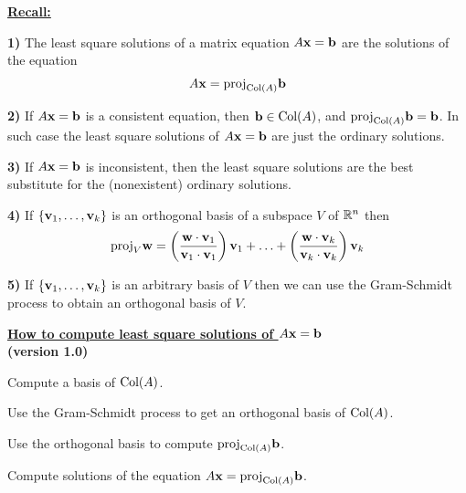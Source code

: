 {\newpage



\underline{\bf Recall:}

\vskip 5mm

{\bf 1)} The least square solutions of a matrix equation $A{\bf x} = {\bf b}$ are the solutions of the equation
$$A{\bf x} = \text{proj}_{\text{Col}(A)}{\bf b}$$

\vskip 15mm

{\bf 2)} If $A{\bf x} = {\bf b}$ is a consistent equation, then ${\bf b} \in \text{Col}(A)$, and $ \text{proj}_{\text{Col}(A)}{\bf b} = {\bf b}$. 
In such case the least square solutions of $A{\bf x} = {\bf b}$ are just the ordinary solutions. 

\vskip 15mm

{\bf 3)} If  $A{\bf x} = {\bf b}$ is inconsistent, then the least square solutions are the best substitute for the 
(nonexistent) ordinary solutions. 

\vskip 15mm

{\bf 4)} If $\{{\bf v}_{1}, \dots, {\bf v}_{k}\}$ is an orthogonal basis of a subspace $V$ of ${\mathbb R}^{n}$ then 
$$
\text{proj}_{V}{\bf w} = 
\left(\frac{{\bf w}\cdot{\bf v}_{1}}{{\bf v}_{1}\cdot {\bf v}_{1}}\right){\bf v}_{1} + {\dots} + 
\left(\frac{{\bf w}\cdot{\bf v}_{k}}{{\bf v}_{k}\cdot {\bf v}_{k}}\right){\bf v}_{k}
$$


\vskip 15mm

{\bf 5)} If $\{{\bf v}_{1}, \dots, {\bf v}_{k}\}$ is an arbitrary basis of $V$ then we can use the Gram-Schmidt process
to obtain  an orthogonal basis of $V$. 
 

\newpage

\begin{center}
\underline{\bf How to compute least square solutions of $A{\bf x} = {\bf b}$}\\[2mm]
{\bf (version 1.0)}
\end{center}

\vskip 5mm

\benu
\item[{\bf 1)}] Compute a basis of $\text{Col}(A)$. \\[-4mm]
\item[{\bf 2)}] Use the Gram-Schmidt process to get an orthogonal basis of $\text{Col}(A)$. \\[-4mm]
\item[{\bf 3)}] Use the orthogonal basis to compute $\text{proj}_{\text{Col}(A)}{\bf b}$. \\[-4mm]
\item[{\bf 4)}]  Compute solutions of the equation $A{\bf x} = \text{proj}_{\text{Col}(A)}{\bf b}$.
\eenu


}
